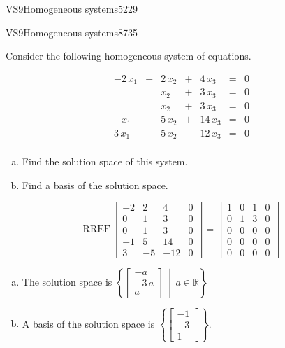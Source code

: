 \begin{exercise}{VS9}{Homogeneous systems}{5229}
\begin{exerciseAnswer}
     \end{exerciseAnswer}
 \end{exercise}


\begin{exercise}{VS9}{Homogeneous systems}{8735} 
\begin{exerciseStatement} 

Consider the following homogeneous system of equations.

 \[\begin{matrix}
 -2 \, x_{1} &  +  & 2 \, x_{2} &  +  & 4 \, x_{3} & = & 0 \\
 &  & x_{2} &  +  & 3 \, x_{3} & = & 0 \\
 &  & x_{2} &  +  & 3 \, x_{3} & = & 0 \\
 -x_{1} &  +  & 5 \, x_{2} &  +  & 14 \, x_{3} & = & 0 \\
 3 \, x_{1} &  -  & 5 \, x_{2} &  -  & 12 \, x_{3} & = & 0 \\
 \end{matrix}\] 

\begin{enumerate}[(a)]
\item  Find the solution space of this system.
\item  Find a basis of the solution space.
\end{enumerate}

     \end{exerciseStatement}
 \begin{exerciseAnswer} 

\[\mathrm{RREF}\,\left[\begin{array}{ccc|c}
-2 & 2 & 4 & 0 \\
0 & 1 & 3 & 0 \\
0 & 1 & 3 & 0 \\
-1 & 5 & 14 & 0 \\
3 & -5 & -12 & 0
\end{array}\right]=\left[\begin{array}{ccc|c}
1 & 0 & 1 & 0 \\
0 & 1 & 3 & 0 \\
0 & 0 & 0 & 0 \\
0 & 0 & 0 & 0 \\
0 & 0 & 0 & 0
\end{array}\right]\]

 

\begin{enumerate}[(a)]
\item The solution space is \( \left\{ \left[\begin{array}{c}
-a \\
-3 \, a \\
a
\end{array}\right] \,\middle|\, a \in\mathbb R \right\} \) 
\item A basis of the solution space is \(\left\{ \left[\begin{array}{c}
-1 \\
-3 \\
1
\end{array}\right] \right\}\).
\end{enumerate}


\end{exerciseAnswer}
\end{exercise}
